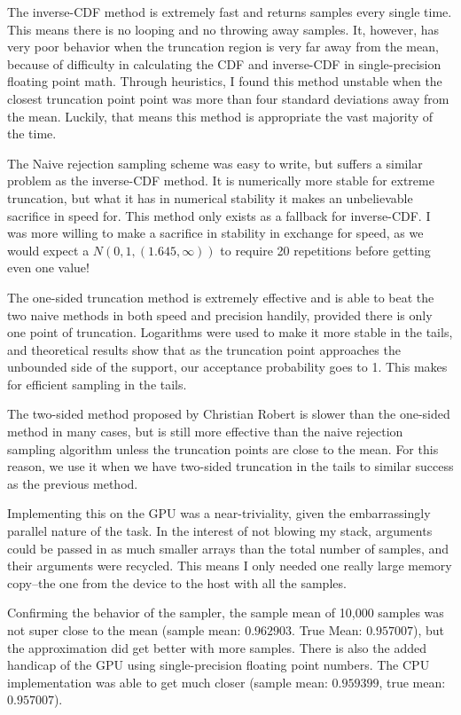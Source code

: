 \documentclass[12pt]{article}
\begin{document}
The inverse-CDF method is extremely fast and returns samples every single time. This means there is no looping and no throwing away samples. It, however, has very poor behavior when the truncation region is very far away from the mean, because of difficulty in calculating the CDF and inverse-CDF in single-precision floating point math. Through heuristics, I found this method unstable when the closest truncation point point was more than four standard deviations away from the mean. Luckily, that means this method is appropriate the vast majority of the time.

The Naive rejection sampling scheme was easy to write, but suffers a similar problem as the inverse-CDF method. It is numerically more stable for extreme truncation, but what it has in numerical stability it makes an unbelievable sacrifice in speed for. This method only exists as a fallback for inverse-CDF. I was more willing to make a sacrifice in stability in exchange for speed, as we would expect a $N(0,1, (1.645, \infty))$ to require 20 repetitions before getting even one value!

The one-sided truncation method is extremely effective and is able to beat the two naive methods in both speed and precision handily, provided there is only one point of truncation. Logarithms were used to make it more stable in the tails, and theoretical results show that as the truncation point approaches the unbounded side of the support, our acceptance probability goes to 1. This makes for efficient sampling in the tails.

The two-sided method proposed by Christian Robert is slower than the one-sided method in many cases, but is still more effective than the naive rejection sampling algorithm unless the truncation points are close to the mean. For this reason, we use it when we have two-sided truncation in the tails to similar success as the previous method.

Implementing this on the GPU was a near-triviality, given the embarrassingly parallel nature of the task. In the interest of not blowing my stack, arguments could be passed in as much smaller arrays than the total number of samples, and their arguments were recycled. This means I only needed one really large memory copy--the one from the device to the host with all the samples.

Confirming the behavior of the sampler, the sample mean of 10,000 samples was not super close to the mean (sample mean: $0.962903$. True Mean: $0.957007$), but the approximation did get better with more samples. There is also the added handicap of the GPU using single-precision floating point numbers. The CPU implementation was able to get much closer (sample mean: $0.959399$, true mean: $0.957007$).
\end{document}
